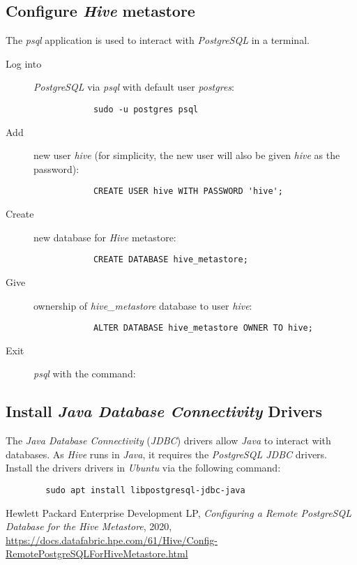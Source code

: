 \documentclass{article}
\begin{document}
    \subsection{Configure \emph{Hive} metastore}
    The \emph{psql} application is used to interact with \emph{PostgreSQL} in a terminal.
    \begin{description}
        \item[Log into] \emph{PostgreSQL} via \emph{psql} with default user \emph{postgres}:
        \begin{verbatim}
            sudo -u postgres psql 
        \end{verbatim}

        \item[Add] new user \emph{hive}
        (for simplicity, the new user will also be given \emph{hive} as the password):
        \begin{verbatim}
            CREATE USER hive WITH PASSWORD 'hive';
        \end{verbatim}

        \item[Create] new database for \emph{Hive} metastore:
        \begin{verbatim}
            CREATE DATABASE hive_metastore;
        \end{verbatim}

        \item[Give] ownership of \emph{hive\_metastore} database to user \emph{hive}:
        \begin{verbatim}
            ALTER DATABASE hive_metastore OWNER TO hive;
        \end{verbatim}

        \item[Exit] \emph{psql} with the command: \texttt{\q}
    \end{description}

    \subsection{Install \emph{Java Database Connectivity} Drivers}
    The \emph{Java Database Connectivity} (\emph{JDBC}) drivers allow \emph{Java} to interact with
    databases. As \emph{Hive} runs in \emph{Java}, it requires the \emph{PostgreSQL JDBC} drivers.
    Install the drivers drivers in \emph{Ubuntu} via the following command:
    \begin{verbatim}
        sudo apt install libpostgresql-jdbc-java
    \end{verbatim}

\newpage
\begin{thebibliography}{9}

        Hewlett Packard Enterprise Development LP,
        \textit{Configuring a Remote PostgreSQL Database for the Hive Metastore},
        2020,
        \url{https://docs.datafabric.hpe.com/61/Hive/Config-RemotePostgreSQLForHiveMetastore.html}
\end{thebibliography}
\end{document}
